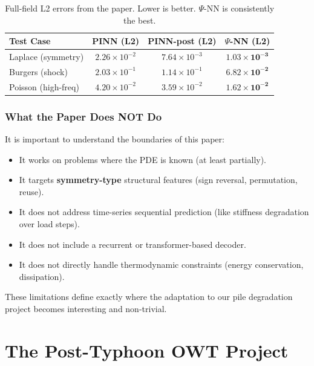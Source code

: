 \documentclass[11pt,a4paper]{article}
\begin{document}
\begin{table}[H]
\centering
\begin{tabular}{@{}lccc@{}}
\toprule
\textbf{Test Case} & \textbf{PINN (L2)} & \textbf{PINN-post (L2)} & \textbf{$\Psi$-NN (L2)} \\
\midrule
Laplace (symmetry) & $2.26 \times 10^{-2}$ & $7.64 \times 10^{-3}$ & $\mathbf{1.03 \times 10^{-3}}$ \\
Burgers (shock) & $2.03 \times 10^{-1}$ & $1.14 \times 10^{-1}$ & $\mathbf{6.82 \times 10^{-2}}$ \\
Poisson (high-freq) & $4.20 \times 10^{-2}$ & $3.59 \times 10^{-2}$ & $\mathbf{1.62 \times 10^{-2}}$ \\
\bottomrule
\end{tabular}
\caption{Full-field L2 errors from the paper. Lower is better. $\Psi$-NN is consistently the best.}
\end{table}

\section{What the Paper Does NOT Do}

It is important to understand the boundaries of this paper:

\begin{itemize}[nosep]
    \item It works on problems where the PDE is known (at least partially).
    \item It targets \textbf{symmetry-type} structural features (sign reversal, permutation, reuse).
    \item It does not address time-series sequential prediction (like stiffness degradation over load steps).
    \item It does not include a recurrent or transformer-based decoder.
    \item It does not directly handle thermodynamic constraints (energy conservation, dissipation).
\end{itemize}

These limitations define exactly where the adaptation to our pile degradation project becomes interesting and non-trivial.


\part{The Post-Typhoon OWT Project}
\end{document}
